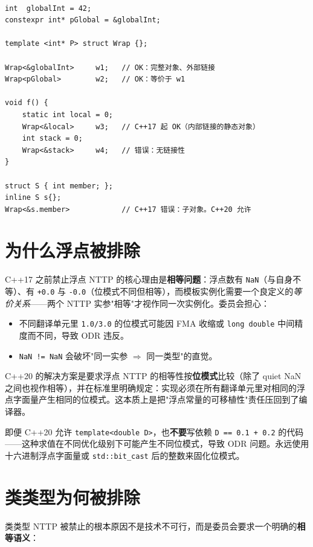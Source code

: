 \documentclass[12pt,a4paper,fontset=fandol]{ctexbook}
\newcommand{\cpplabel}{%
  \tcbox[on line,colback=cppheadbg,colframe=cppheadbg,
    boxrule=0pt,arc=1pt,left=2pt,right=2pt,top=1pt,bottom=1pt,
    colupper=white,fontupper=\scriptsize\bfseries]{C++}}
\newcommand{\cpp}[1]{C++#1}
\newcommand{\kw}[1]{\texttt{#1}}
\begin{document}
\cpplabel\ \begin{lstlisting}
int  globalInt = 42;
constexpr int* pGlobal = &globalInt;

template <int* P> struct Wrap {};

Wrap<&globalInt>     w1;   // OK：完整对象、外部链接
Wrap<pGlobal>        w2;   // OK：等价于 w1

void f() {
    static int local = 0;
    Wrap<&local>     w3;   // C++17 起 OK（内部链接的静态对象）
    int stack = 0;
    Wrap<&stack>     w4;   // 错误：无链接性
}

struct S { int member; };
inline S s{};
Wrap<&s.member>            // C++17 错误：子对象。C++20 允许
\end{lstlisting}

\section{为什么浮点被排除}

\cpp{17} 之前禁止浮点 NTTP 的核心理由是\textbf{相等问题}：浮点数有 \kw{NaN}（与自身不等）、有 \kw{+0.0} 与 \kw{-0.0}（位模式不同但相等），而模板实例化需要一个良定义的\emph{等价关系}——两个 NTTP 实参"相等"才视作同一次实例化。委员会担心：

\begin{itemize}
  \item 不同翻译单元里 \kw{1.0/3.0} 的位模式可能因 FMA 收缩或 \kw{long double} 中间精度而不同，导致 ODR 违反。
  \item \kw{NaN != NaN} 会破坏"同一实参 $\Rightarrow$ 同一类型"的直觉。
\end{itemize}

\cpp{20} 的解决方案是要求浮点 NTTP 的相等性按\textbf{位模式}比较（除了 quiet NaN 之间也视作相等），并在标准里明确规定：实现必须在所有翻译单元里对相同的浮点字面量产生相同的位模式。这本质上是把"浮点常量的可移植性"责任压回到了编译器。

\begin{note}
即便 \cpp{20} 允许 \kw{template<double D>}，也\textbf{不要}写依赖 \kw{D == 0.1 + 0.2} 的代码——这种求值在不同优化级别下可能产生不同位模式，导致 ODR 问题。永远使用十六进制浮点字面量或 \kw{std::bit\_cast} 后的整数来固化位模式。
\end{note}

\section{类类型为何被排除}

类类型 NTTP 被禁止的根本原因不是技术不可行，而是委员会要求一个明确的\textbf{相等语义}：
\end{document}
